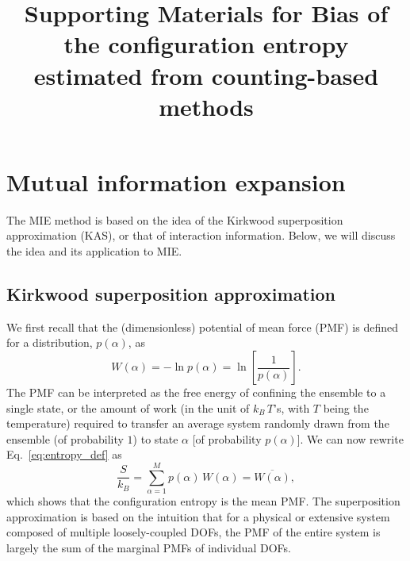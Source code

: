 \documentclass[reprint, superscriptaddress]{revtex4-1}
\begin{document}
\title{Supporting Materials for Bias of the configuration entropy estimated from counting-based methods}



\maketitle


\appendix

\section{\label{sec:MIE_review}
Mutual information expansion}

The MIE method is based on the idea of
the Kirkwood superposition approximation (KAS)\cite{kirkwood1935, born1946},
or that of interaction information\cite{mcgill1954}.
%
Below, we will discuss the idea and its application to MIE.

\subsection{\label{sec:Kirkwood}
Kirkwood superposition approximation}

We first recall that the (dimensionless) potential of mean force (PMF)
is defined for a distribution, $p(\alpha)$,
as
$$
W(\alpha) = -\ln p(\alpha) = \ln\left[ \frac{1}{p(\alpha)} \right].
$$
The PMF can be interpreted as
the free energy of confining the ensemble to a single state,
or the amount of work
(in the unit of $k_B \, T$'s, with $T$ being the temperature)
required to transfer an average system randomly drawn from the ensemble (of probability $1$)
to state $\alpha$ [of probability $p(\alpha)$].
%
We can now rewrite Eq.~\eqref{eq:entropy_def} as
%
\begin{equation}
  \frac{S}{k_B}
  =
  \sum_{\alpha = 1}^M p(\alpha) \, W(\alpha)
  =
  \overline{ W(\alpha) }
  ,
  \label{eq:S_W}
\end{equation}
%
which shows that the configuration entropy
is the mean PMF.
%
The superposition approximation is based on the intuition
that for a physical or extensive system composed of
multiple loosely-coupled DOFs,
the PMF of the entire system is largely
the sum of the marginal PMFs of individual DOFs.
\end{document}
